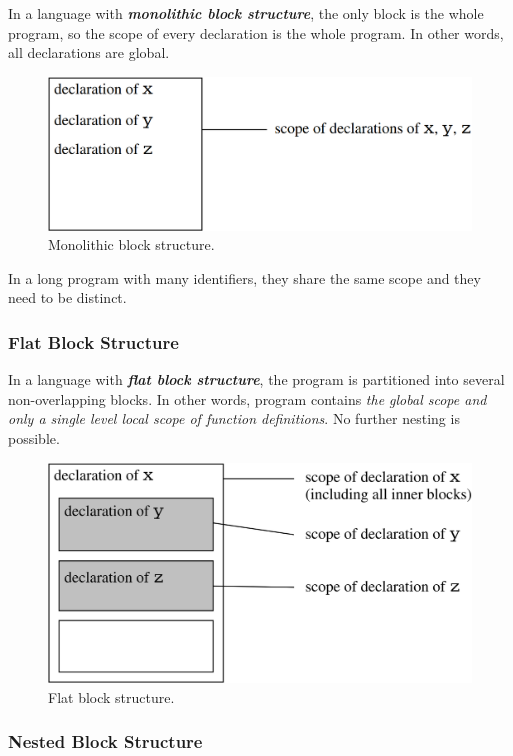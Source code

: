 In a language with \textit{\textbf{monolithic block structure}}, the only block is the whole program, so the scope of every declaration is the whole program. In other words, all declarations are global.
\begin{figure}[H]
  \centering
  \includegraphics[width=\linewidth]{img/fig-4.1.png}
  \caption{Monolithic block structure.}
  \label{fig:fig1}
\end{figure}
In a long program with many identifiers, they share the same scope and they need to be distinct.

\subsubsection{Flat Block Structure}

In a language with \textit{\textbf{flat block structure}}, the program is partitioned into several non-overlapping blocks. In other words, program contains \textit{the global scope and only a single level local scope of function definitions}. No further nesting is possible.

\begin{figure}[H]
  \centering
  \includegraphics[width=\linewidth]{img/fig-4.2.png}
  \caption{Flat block structure.}
  \label{fig:fig2}
\end{figure}

\subsubsection{Nested Block Structure}

